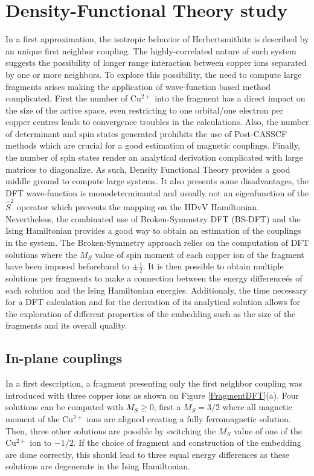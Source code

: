 \documentclass[10pt]{report}
\numberwithin{equation}{section}
\begin{document}
\section{Density-Functional Theory study}

In a first approximation, the isotropic behavior of Herbertsmithite is described by an unique first neighbor coupling. 
The highly-correlated nature of such system suggests the possibility of longer range interaction between copper ions separated by one or more neighbors. 
To explore this possibility, the need to compute large fragments arises making the application of wave-function based method complicated.
First the number of Cu$^{2+}$ into the fragment has a direct impact on the size of the active space, even restricting to one orbital/one electron per copper centres leads to convergence troubles in the calculations.
Also, the number of determinant and spin states generated prohibits the use of Post-CASSCF methods which are crucial for a good estimation of magnetic couplings.
Finally, the number of spin states render an analytical derivation complicated with large matrices to diagonalize.
As such, Density Functional Theory provides a good middle ground to compute large systems. 
It also presents some disadvantages, the DFT wave-function is monodeterminantal and usually not an eigenfunction of the $\hat{S}^2$ operator which prevents the mapping on the HDvV Hamiltonian.
Nevertheless, the combinated use of Broken-Symmetry DFT (BS-DFT) and the Ising Hamiltonian provides a good way to obtain an estimation of the couplings in the system.
The Broken-Symmetry approach relies on the computation of DFT solutions where the $M_S$ value of spin moment of each copper ion of the fragment have been imposed beforehand to $\pm \frac{1}{2}$. 
It is then possible to obtain multiple solutions per fragments to make a connection between the energy differenceés of each solution and the Ising Hamiltonian energies.
Additionaly, the time necessary for a DFT calculation and for the derivation of its analytical solution allows for the exploration of different properties of the embedding such as the size of the fragments and its overall quality.


\subsection{In-plane couplings}

In a first description, a fragment presenting only the first neighbor coupling was introduced with three copper ions as shown on Figure \ref{FragmentDFT}(a).
Four solutions can be computed with $M_S$$\ge$$0$, first a $M_S=3/2$ where all magnetic moment of the Cu$^{2+}$ ions are aligned creating a fully ferromagnetic solution. 
Then, three other solutions are possible by switching the $M_S$ value of one of the Cu$^{2+}$ ion to $-1/2$. 
If the choice of fragment and construction of the embedding are done correctly, this should lead to three equal energy differences as these solutions are degenerate in the Ising Hamiltonian.
\end{document}
